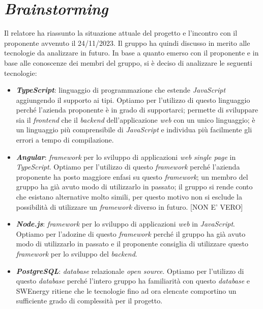 \section{\textit{Brainstorming}}

Il relatore ha riassunto la situazione attuale del progetto e l'incontro con il
proponente avvenuto il 24/11/2023. Il gruppo ha quindi discusso in merito alle
tecnologie da analizzare in futuro. In base a quanto emerso con il proponente e
in base alle conoscenze dei membri del gruppo, si è deciso di analizzare le
seguenti tecnologie:

\begin{itemize}
	\item \textbf{\textit{TypeScript}}: linguaggio di programmazione che estende
	      \textit{JavaScript} aggiungendo il supporto ai tipi. Optiamo per
	      l'utilizzo di questo linguaggio perché l'azienda proponente è in grado
	      di supportarci; permette di sviluppare sia il \textit{frontend} che il
	      \textit{backend} dell'applicazione \textit{web} con un unico
	      linguaggio; è un linguaggio più comprensibile di \textit{JavaScript} e
	      individua più facilmente gli errori a tempo di compilazione.

	\item \textbf{\textit{Angular}}: \textit{framework} per lo sviluppo di
	      applicazioni \textit{web single page} in \textit{TypeScript}. Optiamo
	      per l'utilizzo di questo \textit{framework} perché l'azienda
	      proponente ha posto maggiore enfasi su questo \textit{framework}; un
	      membro del gruppo ha già avuto modo di utilizzarlo in passato; il
	      gruppo si rende conto  che esistano alternative molto simili, per
	      questo motivo non si esclude la possibilità di utilizzare un
	      \textit{framework} diverso in futuro. [NON E' VERO]


	\item \textbf{\textit{Node.js}}: \textit{framework} per lo sviluppo di
	      applicazioni \textit{web} in \textit{JavaScript}. Optiamo per
	      l'adozine di questo \textit{framework} perché il gruppo ha già avuto
	      modo di utilizzarlo in passato e il proponente consiglia di utilizzare
	      questo \textit{framework} per lo sviluppo del \textit{backend}.


	\item \textbf{\textit{PostgreSQL}}: \textit{database} relazionale
	      \textit{open source}. Optiamo per l'utilizzo di questo
	      \textit{database} perché l'intero gruppo ha familiarità con questo
	      \textit{database} e SWEnergy ritiene che le tecnologie fino ad ora
	      elencate comportino un sufficiente grado di complessità per il
	      progetto.
\end{itemize}

